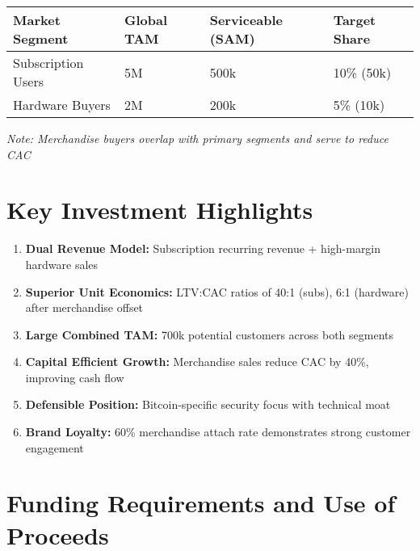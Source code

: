 \documentclass[11pt]{article}
\begin{document}
\begin{table}[H]
\centering
\begin{tabularx}{\linewidth}{l Y Y Y}
\toprule
Market Segment & Global TAM & Serviceable (SAM) & Target Share \\\midrule
Subscription Users & 5M & 500k & 10\% (50k) \\
Hardware Buyers & 2M & 200k & 5\% (10k) \\
\bottomrule
\end{tabularx}
\end{table}
\textit{Note: Merchandise buyers overlap with primary segments and serve to reduce CAC}

\section{Key Investment Highlights}

\begin{enumerate}
  \item \textbf{Dual Revenue Model:} Subscription recurring revenue + high-margin hardware sales
  \item \textbf{Superior Unit Economics:} LTV:CAC ratios of 40:1 (subs), 6:1 (hardware) after merchandise offset
  \item \textbf{Large Combined TAM:} 700k potential customers across both segments
  \item \textbf{Capital Efficient Growth:} Merchandise sales reduce CAC by 40\%, improving cash flow
  \item \textbf{Defensible Position:} Bitcoin-specific security focus with technical moat
  \item \textbf{Brand Loyalty:} 60\% merchandise attach rate demonstrates strong customer engagement
\end{enumerate}

\section{Funding Requirements and Use of Proceeds}
\end{document}

